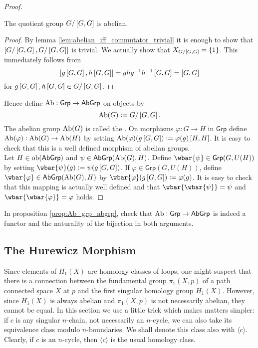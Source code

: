 \begin{proof}
	\begin{corollary}
		The quotient group $G/\sbr{G,G}$ is abelian.
	\end{corollary}

	\begin{proof}
		By lemma \ref{lem:abelian_iff_commutator_trivial} it is enough to show that $\sbr[0]{G/\sbr{G,G},G/\sbr{G,G}}$ is trivial. We actually show that $X_{G/\sbr[0]{G,G}} = \cbr{1}$. This immediately follows from
		\begin{equation*}
			\sbr[0]{g\sbr{G,G},h\sbr{G,G}} = ghg^{-1}h^{-1}\sbr{G,G} = \sbr{G,G}
		\end{equation*}
		\noindent for $g\sbr{G,G},h\sbr{G,G} \in G/\sbr{G,G}$.
	\end{proof}

	Hence define $\operatorname{Ab} : \mathsf{Grp} \to \mathsf{AbGrp}$ on objects by
	\begin{equation*}
		\Ab(G) := G/\sbr{G,G}.
	\end{equation*}
	The abelian group $\operatorname{Ab}(G)$ is called the . On morphisms $\varphi : G \to H$ in $\mathsf{Grp}$ define $\operatorname{Ab}(\varphi) : \operatorname{Ab}(G) \to \operatorname{Ab}(H)$ by setting $\Ab(\varphi)(g\sbr{G,G}) := \varphi(g)\sbr{H,H}$. It is easy to check that this is a well defined morphism of abelian groups.\\
	Let $H \in \operatorname{ob}(\mathsf{AbGrp})$ and $\psi \in \mathsf{AbGrp}(\operatorname{Ab}(G),H)$. Define $\wbar{\psi} \in \mathsf{Grp}(G,U(H))$ by setting $\wbar{\psi}(g) := \psi(g\sbr{G,G})$. If $\varphi \in \mathsf{Grp}(G,U(H))$, define $\wbar{\varphi} \in \mathsf{AbGrp}(\Ab(G),H)$ by $\wbar{\varphi}(g\sbr{G,G}) := \varphi(g)$. It is easy to check that this mapping is actually well defined and that $\wbar{\wbar{\psi}} = \psi$ and $\wbar{\wbar{\varphi}} = \varphi$ holds.
\end{proof}

\begin{exercise}
	In proposition \ref{prop:Ab_grp_abgrp}, check that $\operatorname{Ab} : \mathsf{Grp} \to \mathsf{AbGrp}$ is indeed a functor and the naturality of the bijection in both arguments. 
\end{exercise}

\subsection*{The Hurewicz Morphism}
Since elements of $H_1(X)$ are homology classes of loops, one might suspect that there is a connection between the fundamental group $\pi_1(X,p)$ of a path connected space $X$ at $p$ and the first singular homology group $H_1(X)$. However, since $H_1(X)$ is always abelian and $\pi_1(X,p)$ is not necessarily abelian, they cannot be equal. In this section we use a little trick which makes matters simpler: if $c$ is any singular $n$-chain, not necessarily an $n$-cycle, we can also take its equivalence class modulo $n$-boundaries. We shall denote this class also with $\langle c \rangle$. Clearly, if $c$ is an $n$-cycle, then $\langle c \rangle$ is the usual homology class.

